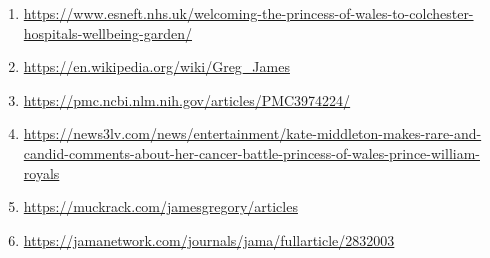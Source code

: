 \documentclass[10pt,a4paper]{article}
\begin{document}
\begin{enumerate}[leftmargin=*]
            \item \url{ https://www.esneft.nhs.uk/welcoming-the-princess-of-wales-to-colchester-hospitals-wellbeing-garden/ }
            \item \url{ https://en.wikipedia.org/wiki/Greg\_James }
            \item \url{ https://pmc.ncbi.nlm.nih.gov/articles/PMC3974224/ }
            \item \url{ https://news3lv.com/news/entertainment/kate-middleton-makes-rare-and-candid-comments-about-her-cancer-battle-princess-of-wales-prince-william-royals }
            \item \url{ https://muckrack.com/jamesgregory/articles }
            \item \url{ https://jamanetwork.com/journals/jama/fullarticle/2832003 }
    \end{enumerate}
\vspace{1em}
\end{document}

